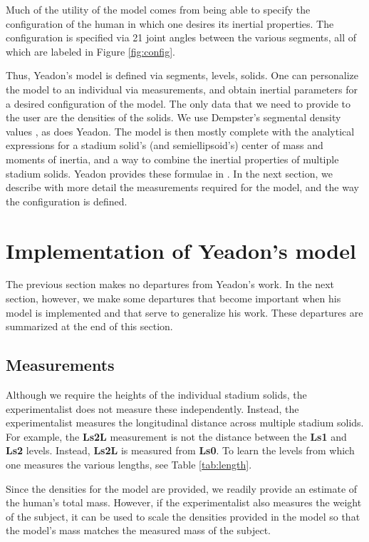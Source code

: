 \documentclass[10pt]{article}
\begin{document}
Much of the utility of the model comes from being able to specify the
configuration of the human in which one desires its inertial properties. The
configuration is specified via 21 joint angles between the various segments,
all of which are labeled in Figure \ref{fig:config}.

Thus, Yeadon's model is defined via segments, levels, solids. One can
personalize the model to an individual via measurements, and obtain inertial
parameters for a desired configuration of the model. The only data that we need
to provide to the user are the densities of the solids. We use Dempster's
segmental density values \cite{Dempster1955}, as does Yeadon. The model is then
mostly complete with the analytical expressions for a stadium solid's (and semiellipsoid's) center of
mass and moments of inertia, and a way to combine the inertial properties of
multiple stadium solids. Yeadon provides these formulae in \cite{Yeadon1990f}.
In the next section, we describe with more detail the measurements required for
the model, and the way the configuration is defined.


\section*{Implementation of Yeadon's model}

The previous section makes no departures from Yeadon's work. In the next
section, however, we make some departures that become important when his model
is implemented and that serve to generalize his work. These departures are
summarized at the end of this section.

\subsection*{Measurements}

Although we require the heights of the individual stadium solids, the
experimentalist does not measure these independently. Instead, the
experimentalist measures the longitudinal distance across multiple stadium
solids. For example, the \textbf{Ls2L} measurement is not the distance between
the \textbf{Ls1} and \textbf{Ls2} levels. Instead, \textbf{Ls2L} is measured
from \textbf{Ls0}. To learn the levels from which one measures the various
lengths, see Table \ref{tab:length}.

Since the densities for the model are provided, we readily provide an estimate
of the human's total mass. However, if the experimentalist also measures the
weight of the subject, it can be used to scale the densities provided in the
model so that the model's mass matches the measured mass of the subject.
\end{document}
